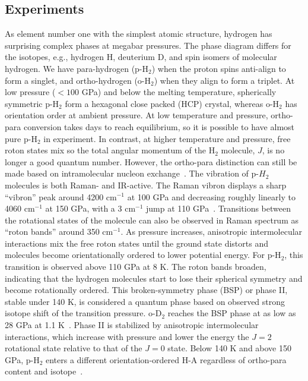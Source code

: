\subsection{Experiments}
\label{sec:hsoli-expt}

As element number one with the simplest atomic structure, hydrogen has surprising complex phases at megabar pressures.
The phase diagram differs for the isotopes, e.g., hydrogen H, deuterium D, and spin isomers of molecular hydrogen.
We have para-hydrogen (p-H$_2$) when the proton spins anti-align to form a singlet, and ortho-hydrogen (o-H$_2$) when they align to form a triplet.
At low pressure ($<100$ GPa) and below the melting temperature, spherically symmetric p-H$_2$ form a hexagonal close packed (HCP) crystal, whereas o-H$_2$ has orientation order at ambient pressure.
At low temperature and pressure, ortho-para conversion takes days to reach equilibrium, so it is possible to have almost pure p-H$_2$ in experiment. In contrast, at higher temperature and pressure, free roton states mix so the total angular momentum of the H$_2$ molecule, $J$, is no longer a good quantum number. However, the ortho-para distinction can still be made based on intramolecular nucleon exchange~\cite{Silvera1998}. 
The vibration of p-$H_2$ molecules is both Raman- and IR-active. The Raman vibron displays a sharp ``vibron'' peak around 4200 cm$^{-1}$ at 100 GPa and decreasing roughly linearly to 4060 cm$^{-1}$ at 150 GPa, with a 3 cm$^{-1}$ jump at 110 GPa~\cite{Lorenzana1990}.
Transitions between the rotational states of the molecule can also be observed in Raman spectrum as ``roton bands'' around 350 cm$^{-1}$. As pressure increases, anisotropic intermolecular interactions mix the free roton states until the ground state distorts and molecules become orientationally ordered to lower potential energy. For p-H$_2$, this transition is observed above 110 GPa at 8 K. The roton bands broaden, indicating that the hydrogen molecules start to lose their spherical symmetry and become rotationally ordered. This broken-symmetry phase (BSP) or phase II, stable under 140 K, is considered a quantum phase based on observed strong isotope shift of the transition pressure. o-D$_2$ reaches the BSP phase at as low as 28 GPa at 1.1 K~\cite{Silvera1981}.
Phase II is stabilized by anisotropic intermolecular interactions, which increase with pressure and lower the energy the $J=2$ rotational state relative to that of the $J=0$ state.
Below 140 K and above 150 GPa, p-H$_2$ enters a different orientation-ordered H-A regardless of ortho-para content and isotope~\cite{Cui1995,Goncharov1998}.
